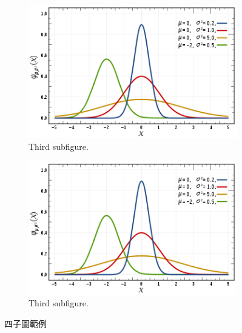 \begin{figure}[htbp]
\begin{subfigure}{0.4\textwidth}
        \includegraphics[width=\textwidth]{figures/gambar.png}
        \caption{Third subfigure.}
        \label{fig:third}
    \end{subfigure}
    \hfill
    \begin{subfigure}{0.4\textwidth}
        \includegraphics[width=\textwidth]{figures/gambar.png}
        \caption{Third subfigure.}
        \label{fig:fourth}
    \end{subfigure}
            
    \caption{四子圖範例}
    \label{fig:four graphs}
\end{figure}
